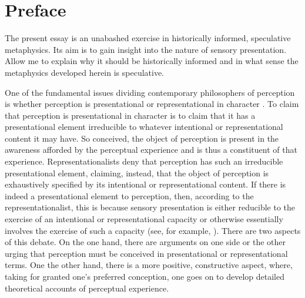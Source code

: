 \chapter*{Preface} %
\label{cha:preface}

The present essay is an unabashed exercise in historically informed, speculative metaphysics. Its aim is to gain insight into the nature of sensory presentation. Allow me to explain why it should be historically informed and in what sense the metaphysics developed herein is speculative.

One of the fundamental issues dividing contemporary philosophers of perception is whether perception is presentational or representational in character \citep[see, for example, the recent collection devoted to this topic][]{Brogaard:2014af}. To claim that perception is presentational in character is to claim that it has a presentational element irreducible to whatever intentional or representational content it may have. So conceived, the object of perception is present in the awareness afforded by the perceptual experience and is thus a constituent of that experience. Representationalists deny that perception has such an irreducible presentational element, claiming, instead, that the object of perception is exhaustively specified by its intentional or representational content. If there is indeed a presentational element to perception, then, according to the representationalist, this is because sensory presentation is either reducible to the exercise of an intentional or representational capacity or otherwise essentially involves the exercise of such a capacity (see, for example, \citealt{Chalmers:2006kx,McDowell:2008fk,Searle:2015fu}). There are two aspects of this debate. On the one hand, there are arguments on one side or the other urging that perception must be conceived in presentational or representational terms. One the other hand, there is a more positive, constructive aspect, where, taking for granted one's preferred conception, one goes on to develop detailed theoretical accounts of perceptual experience. 

